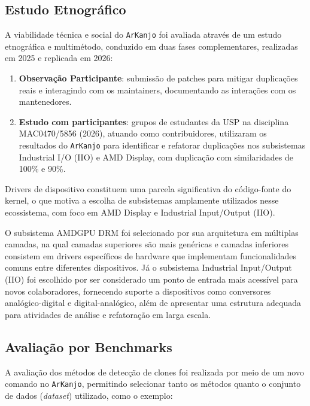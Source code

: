 \documentclass[twocolumn]{article}
\begin{document}
\subsection{Estudo Etnográfico}

A viabilidade técnica e social do \texttt{ArKanjo} foi avaliada através de um estudo etnográfica e multimétodo, conduzido em duas fases complementares, realizadas em 2025 e replicada em 2026:

\begin{enumerate}
    \item \textbf{Observação Participante}: submissão de patches para mitigar duplicações reais e interagindo com os maintainers, documentando as interações com os mantenedores.

    \item \textbf{Estudo com participantes}: grupos de estudantes da USP na disciplina MAC0470/5856 (2026), atuando como contribuidores, utilizaram os resultados do \texttt{ArKanjo} para identificar e refatorar duplicações nos subsistemas Industrial I/O (IIO) e AMD Display, com duplicação com similaridades de 100\% e 90\%.
\end{enumerate}

Drivers de dispositivo constituem uma parcela significativa do código-fonte do kernel, o que motiva a escolha de subsistemas amplamente utilizados nesse ecossistema, com foco em AMD Display e Industrial Input/Output (IIO).

O subsistema AMDGPU DRM foi selecionado por sua arquitetura em múltiplas camadas, na qual camadas superiores são mais genéricas e camadas inferiores consistem em drivers específicos de hardware que implementam funcionalidades comuns entre diferentes dispositivos\cite{Wang2011}. Já o subsistema Industrial Input/Output (IIO) foi escolhido por ser considerado um ponto de entrada mais acessível para novos colaboradores, fornecendo suporte a dispositivos como conversores analógico-digital e digital-analógico, além de apresentar uma estrutura adequada para atividades de análise e refatoração em larga escala.

\subsection{Avaliação por Benchmarks}

A avaliação dos métodos de detecção de clones foi realizada por meio de um novo comando no \texttt{ArKanjo}, permitindo selecionar tanto os métodos quanto o conjunto de dados (\textit{dataset}) utilizado, como o exemplo:
\end{document}
